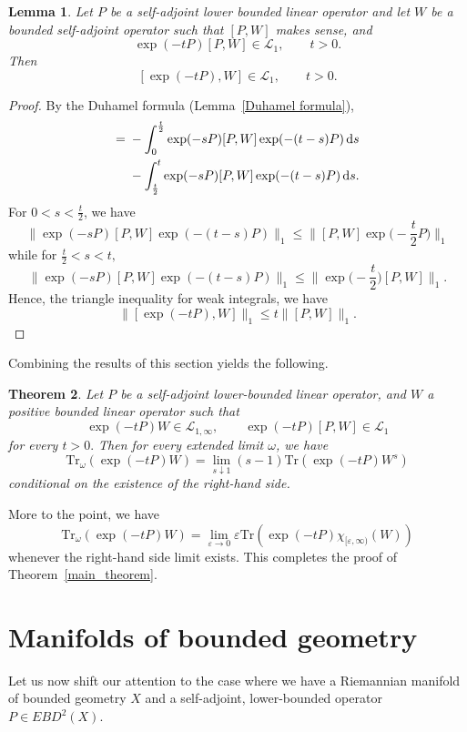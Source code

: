 \documentclass[pdftex]{sigma}
\numberwithin{equation}{section}
\newtheorem{Theorem}{Theorem}[section]
\newtheorem{Lemma}[Theorem]{Lemma}
\begin{document}
\begin{Lemma}
 Let $P$ be a self-adjoint lower bounded linear operator
 and let $W$ be a bounded self-adjoint operator such that $[P,W]$ makes sense, and
 \[
 \exp(-tP)[P,W] \in \mathcal{L}_1,\qquad t > 0.
 \]
 Then
 \[
 [\exp(-tP),W]\in \mathcal{L}_1,\qquad t > 0.
 \]
\end{Lemma}
\begin{proof}
 By the Duhamel formula (Lemma~\ref{Duhamel formula}),
 \begin{align*}
 [\exp(-tP),W]={}& -\int_0^{\frac{t}{2}}\exp(-sP)[P,W]\exp(-(t-s)P)\,{\rm d}s\\
 & -\int_{\frac{t}{2}}^t \exp(-sP)[P,W]\exp(-(t-s)P)\,{\rm d}s.
 \end{align*}
 For $0<s<\frac{t}{2}$, we have
 \[
 \|\exp(-sP)[P,W]\exp(-(t-s)P)\|_1 \leq \bigg\|[P,W]\exp\biggl(-\frac{t}{2}P\biggr)\bigg\|_1
 \]
 while for $\frac{t}{2}<s<t,$
 \[
 \|\exp(-sP)[P,W]\exp(-(t-s)P)\|_1 \leq \bigg\|\exp\biggl(-\frac{t}{2}\biggr)[P,W]\bigg\|_1.
 \]
 Hence, the triangle inequality for weak integrals, we have
 \[
 \|[\exp(-tP),W]\|_1 \leq t\|[P,W]\|_1.
 \tag*{\qed}
 \]
 \renewcommand{\qed}{}
\end{proof}


Combining the results of this section yields the following.
\begin{Theorem}%
 Let $P$ be a self-adjoint lower-bounded linear operator, and $W$ a positive bounded linear operator such that
 \[
 \exp(-tP)W\in \mathcal{L}_{1,\infty},\qquad \exp(-tP)[P,W] \in \mathcal{L}_{1}
 \]
 for every $t>0.$
 Then for every extended limit $\omega$, we have
 \[
 \mathrm{Tr}_{\omega}(\exp(-tP)W) = \lim_{s\downarrow1} (s-1)\mathrm{Tr}(\exp(-tP)W^s)
 \]
 conditional on the existence of the right-hand side.
\end{Theorem}

More to the point, we have
\[
 \mathrm{Tr}_{\omega}(\exp(-tP)W) = \lim_{\varepsilon\to 0} \varepsilon\mathrm{Tr}(\exp(-tP)\chi_{[\varepsilon,\infty)}(W))
\]
whenever the right-hand side limit exists. This completes the proof of Theorem~\ref{main_theorem}.

\section{Manifolds of bounded geometry}%
Let us now shift our attention to the case where we have a Riemannian manifold of bounded geometry $X$ and a self-adjoint, lower-bounded operator $P \in EBD^2(X)$.
\end{document}
